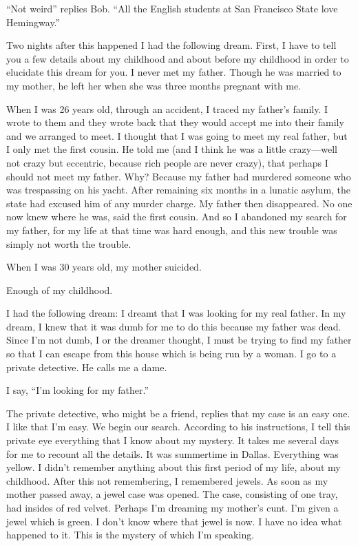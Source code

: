 \documentclass[
]{memoir}
\begin{document}
``Not weird'' replies Bob. ``All the English students at San Francisco
State love Hemingway.''

Two nights after this happened I had the following dream. First, I have
to tell you a few details about my childhood and about before my
childhood in order to elucidate this dream for you. I never met my
father. Though he was married to my mother, he left her when she was
three months pregnant with me.

When I was 26 years old, through an accident, I traced my father's
family. I wrote to them and they wrote back that they would accept me
into their family and we arranged to meet. I thought that I was going to
meet my real father, but I only met the first cousin. He told me (and I
think he was a little crazy---well not crazy but eccentric, because rich
people are never crazy), that perhaps I should not meet my father. Why?
Because my father had murdered someone who was trespassing on his yacht.
After remaining six months in a lunatic asylum, the state had excused
him of any murder charge. My father then disappeared. No one now knew
where he was, said the first cousin. And so I abandoned my search for my
father, for my life at that time was hard enough, and this new trouble
was simply not worth the trouble.

When I was 30 years old, my mother suicided.

Enough of my childhood.

I had the following dream: I dreamt that I was looking for my real
father. In my dream, I knew that it was dumb for me to do this because
my father was dead. Since I'm not dumb, I or the dreamer thought, I must
be trying to find my father so that I can escape from this house which
is being run by a woman. I go to a private detective. He calls me a
dame.

I say, ``I'm looking for my father.''

The private detective, who might be a friend, replies that my case is an
easy one. I like that I'm easy. We begin our search. According to his
instructions, I tell this private eye everything that I know about my
mystery. It takes me several days for me to recount all the details. It
was summertime in Dallas. Everything was yellow. I didn't remember
anything about this first period of my life, about my childhood. After
this not remembering, I remembered jewels. As soon as my mother passed
away, a jewel case was opened. The case, consisting of one tray, had
insides of red velvet. Perhaps I'm dreaming my mother's cunt. I'm given
a jewel which is green. I don't know where that jewel is now. I have no
idea what happened to it. This is the mystery of which I'm speaking.
\end{document}
